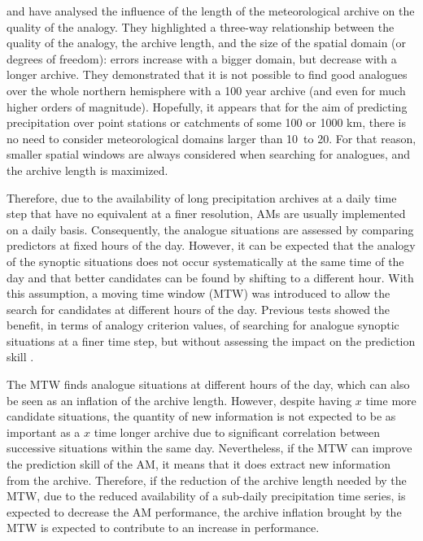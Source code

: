 \documentclass[hess, manuscript]{copernicus}
\begin{document}
	\citet{Ruosteenoja1988} and \citet{Vandendool1994} have analysed the influence of the length of the meteorological archive on the quality of the analogy. They highlighted a three-way relationship between the quality of the analogy, the archive length, and the size of the spatial domain (or degrees of freedom): errors increase with a bigger domain, but decrease with a longer archive. They demonstrated that it is not possible to find good analogues over the whole northern hemisphere with a 100 year archive (and even for much higher orders of magnitude). Hopefully, it appears that for the aim of predicting precipitation over point stations or catchments of some 100 or 1000 km\texttwosuperior, there is no need to consider meteorological domains larger than 10\textdegree\ to 20\textdegree. For that reason, smaller spatial windows are always considered when searching for analogues, and the archive length is maximized. 
	
	Therefore, due to the availability of long precipitation archives at a daily time step that have no equivalent at a finer resolution, AMs are usually implemented on a daily basis. Consequently, the analogue situations are assessed by comparing predictors at fixed hours of the day. However, it can be expected that the analogy of the synoptic situations does not occur systematically at the same time of the day and that better candidates can be found by shifting to a different hour. With this assumption, a moving time window (MTW) was introduced to allow the search for candidates at different hours of the day. Previous tests showed the benefit, in terms of analogy criterion values, of searching for analogue synoptic situations at a finer time step, but without assessing the impact on the prediction skill \citep{Finet2008}.
	
	The MTW finds analogue situations at different hours of the day, which can also be seen as an inflation of the archive length. However, despite having $x$ time more candidate situations, the quantity of new information is not expected to be as important as a $x$ time longer archive due to significant correlation between successive situations within the same day. Nevertheless, if the MTW can improve the prediction skill of the AM, it means that it does extract new information from the archive. Therefore, if the reduction of the archive length needed by the MTW, due to the reduced availability of a sub-daily precipitation time series, is expected to decrease the AM performance, the archive inflation brought by the MTW is expected to contribute to an increase in performance.
	
\end{document}
